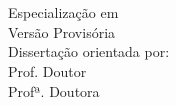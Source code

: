 \begin{center}
\vspace{1cm}
\vfill
\Large{\bf {}\selectfont \Autor}\\
\vspace{1,8 cm}
\vfill
\large{\bf{\selectfont \MDesignacao }}\\
\large{\selectfont Especializa\c{c}\~{a}o em \MEspecializacao}\\
\vspace{0.8cm}
\vfill
\normalsize{\selectfont Versão Provis\'{o}ria}\\
\vspace{0.8cm}
\vfill
\large{\selectfont Disserta\c{c}\~{a}o orientada por:}\\
\large{\selectfont Prof. Doutor \Orientador} \\
\large{\selectfont Profª. Doutora \PCoOrientador} \\
\vspace{1.5 cm}
\vfill

\vfill
\PEIAno
\end{center}
\newpage
\mbox{}

\newpage

\setcounter{page}{1}

